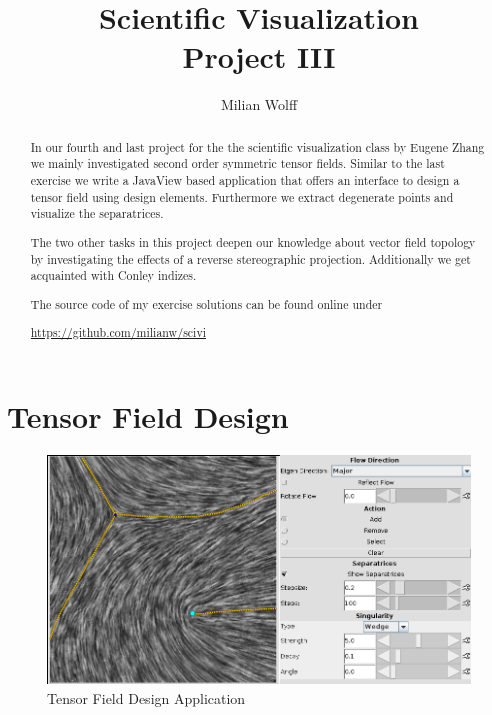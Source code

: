 \documentclass[a4paper,10pt,notitlepage]{scrartcl}
\title{Scientific Visualization\\Project III}
\author{Milian Wolff}
\begin{document}
\maketitle

\begin{abstract}
In our fourth and last project for the the scientific visualization class
by Eugene Zhang we mainly investigated second order symmetric tensor fields.
Similar to the last exercise we write a JavaView based application that offers
an interface to design a tensor field using design elements. Furthermore we
extract degenerate points and visualize the separatrices.

The two other tasks in this project deepen our knowledge about vector field
topology by investigating the effects of a reverse stereographic projection.
Additionally we get acquainted with Conley indizes.

The source code of my exercise solutions can be found online under

\begin{center}\url{https://github.com/milianw/scivi}\end{center}
\end{abstract}

\begingroup
\let\clearpage\relax

\tableofcontents
\endgroup

\section{Tensor Field Design}

\begin{figure}
 \centering
 \includegraphics[scale=0.5]{img-4-2/app.png}
 \caption{Tensor Field Design Application}
 \label{fig:tfd-app}
\end{figure}
\end{document}
